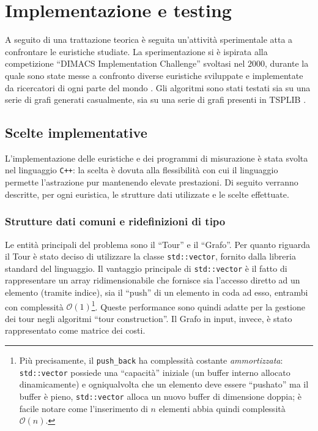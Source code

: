 \chapter{Implementazione e testing}

A seguito di una trattazione teorica è seguita un'attività sperimentale atta a confrontare le euristiche 
studiate. La sperimentazione si è ispirata alla competizione ``DIMACS Implementation Challenge'' svoltasi 
nel $2000$, durante la quale sono state messe a confronto diverse euristiche sviluppate e implementate da 
ricercatori di ogni parte del mondo \cite{STSP}. Gli algoritmi sono stati testati sia su una serie di grafi 
generati casualmente, sia su una serie di grafi presenti in TSPLIB \cite{tsplib}.

\section{Scelte implementative}

L'implementazione delle euristiche e dei programmi di misurazione è stata svolta nel linguaggio \texttt{C++}: la 
scelta è dovuta alla flessibilità con cui il linguaggio permette l'astrazione pur mantenendo elevate prestazioni.
Di seguito verranno descritte, per ogni euristica, le strutture dati utilizzate e le scelte effettuate.

\subsection{Strutture dati comuni e ridefinizioni di tipo}

Le entità principali del problema sono il ``Tour'' e il ``Grafo''. Per quanto riguarda il Tour è stato 
deciso di utilizzare la classe \texttt{std::vector}, fornito dalla libreria standard del 
linguaggio. Il vantaggio principale di \texttt{std::vector} è il fatto di rappresentare un array 
ridimensionabile che fornisce sia l'accesso diretto ad un elemento (tramite indice), sia il ``push'' 
di un elemento in coda ad esso, entrambi con complessità $\mathcal{O}(1)$\footnote{Più precisamente, il 
\texttt{push\_back} ha complessità costante \textit{ammortizzata}: \texttt{std::vector} possiede una 
``capacità'' iniziale (un buffer interno allocato dinamicamente) e ogniqualvolta che un elemento deve essere 
``pushato'' ma il buffer è pieno, \texttt{std::vector} alloca un nuovo buffer di dimensione doppia; è facile 
notare come l'inserimento di $n$ elementi abbia quindi complessità $\mathcal{O}(n).$}. Queste performance sono 
quindi adatte per la gestione dei tour negli algoritmi ``tour construction''. Il Grafo in input,
invece, è stato rappresentato come matrice dei costi.


